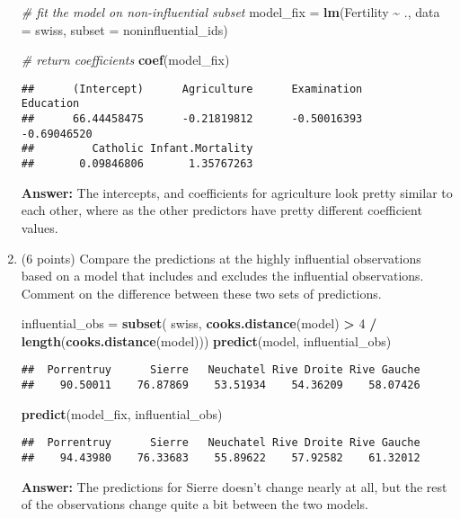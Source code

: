 \documentclass[
]{article}
\newenvironment{Shaded}{\begin{snugshade}}{\end{snugshade}}
\newcommand{\AttributeTok}[1]{\textcolor[rgb]{0.13,0.29,0.53}{#1}}
\newcommand{\CommentTok}[1]{\textcolor[rgb]{0.56,0.35,0.01}{\textit{#1}}}
\newcommand{\DecValTok}[1]{\textcolor[rgb]{0.00,0.00,0.81}{#1}}
\newcommand{\FunctionTok}[1]{\textcolor[rgb]{0.13,0.29,0.53}{\textbf{#1}}}
\newcommand{\NormalTok}[1]{#1}
\newcommand{\OtherTok}[1]{\textcolor[rgb]{0.56,0.35,0.01}{#1}}
\newcommand{\SpecialCharTok}[1]{\textcolor[rgb]{0.81,0.36,0.00}{\textbf{#1}}}
\begin{document}
\begin{enumerate}
\begin{Shaded}
\begin{Highlighting}[]
\CommentTok{\# fit the model on non{-}influential subset}
\NormalTok{model\_fix }\OtherTok{=} \FunctionTok{lm}\NormalTok{(Fertility }\SpecialCharTok{\textasciitilde{}}\NormalTok{ .,}
               \AttributeTok{data =}\NormalTok{ swiss,}
               \AttributeTok{subset =}\NormalTok{ noninfluential\_ids)}

\CommentTok{\# return coefficients}
\FunctionTok{coef}\NormalTok{(model\_fix)}
\end{Highlighting}
\end{Shaded}

\begin{verbatim}
##      (Intercept)      Agriculture      Examination        Education 
##      66.44458475      -0.21819812      -0.50016393      -0.69046520 
##         Catholic Infant.Mortality 
##       0.09846806       1.35767263
\end{verbatim}

  \textbf{Answer:} The intercepts, and coefficients for agriculture look
  pretty similar to each other, where as the other predictors have
  pretty different coefficient values.
\item
  (6 points) Compare the predictions at the highly influential
  observations based on a model that includes and excludes the
  influential observations. Comment on the difference between these two
  sets of predictions.

\begin{Shaded}
\begin{Highlighting}[]
\NormalTok{influential\_obs }\OtherTok{=} \FunctionTok{subset}\NormalTok{(}
\NormalTok{    swiss, }\FunctionTok{cooks.distance}\NormalTok{(model) }\SpecialCharTok{\textgreater{}} \DecValTok{4} \SpecialCharTok{/} \FunctionTok{length}\NormalTok{(}\FunctionTok{cooks.distance}\NormalTok{(model)))}
\FunctionTok{predict}\NormalTok{(model, influential\_obs)}
\end{Highlighting}
\end{Shaded}

\begin{verbatim}
##  Porrentruy      Sierre   Neuchatel Rive Droite Rive Gauche 
##    90.50011    76.87869    53.51934    54.36209    58.07426
\end{verbatim}

\begin{Shaded}
\begin{Highlighting}[]
\FunctionTok{predict}\NormalTok{(model\_fix, influential\_obs)}
\end{Highlighting}
\end{Shaded}

\begin{verbatim}
##  Porrentruy      Sierre   Neuchatel Rive Droite Rive Gauche 
##    94.43980    76.33683    55.89622    57.92582    61.32012
\end{verbatim}

  \textbf{Answer:} The predictions for Sierre doesn't change nearly at
  all, but the rest of the observations change quite a bit between the
  two models.
\end{enumerate}
\end{document}
